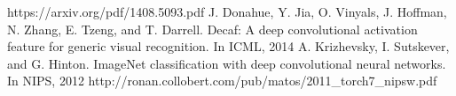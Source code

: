 \documentclass[a4paper,english,russian]{G2-105}
\begin{document}
\newpage
\begin{thebibliography}{1}
     https://arxiv.org/pdf/1408.5093.pdf
     J. Donahue, Y. Jia, O. Vinyals, J. Hoffman, N. Zhang, 
E. Tzeng, and T. Darrell. Decaf: A deep convolutional
activation feature for generic visual recognition. In ICML,
2014
  	  A. Krizhevsky, I. Sutskever, and G. Hinton. ImageNet
classification with deep convolutional neural networks. In
NIPS, 2012
	 http://ronan.collobert.com/pub/matos/2011\_torch7\_nipsw.pdf
\end{thebibliography}

\end{document}

